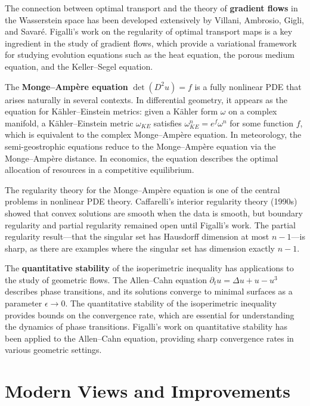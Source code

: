 The connection between optimal transport and the theory of \textbf{gradient flows} in the Wasserstein space has been developed extensively by Villani, Ambrosio, Gigli, and Savar\'e. Figalli's work on the regularity of optimal transport maps is a key ingredient in the study of gradient flows, which provide a variational framework for studying evolution equations such as the heat equation, the porous medium equation, and the Keller--Segel equation.

The \textbf{Monge--Amp\`ere equation} $\det(D^2 u) = f$ is a fully nonlinear PDE that arises naturally in several contexts. In differential geometry, it appears as the equation for K\"ahler--Einstein metrics: given a K\"ahler form $\omega$ on a complex manifold, a K\"ahler--Einstein metric $\omega_{KE}$ satisfies $\omega_{KE}^n = e^f \omega^n$ for some function $f$, which is equivalent to the complex Monge--Amp\`ere equation. In meteorology, the semi-geostrophic equations reduce to the Monge--Amp\`ere equation via the Monge--Amp\`ere distance. In economics, the equation describes the optimal allocation of resources in a competitive equilibrium.

The regularity theory for the Monge--Amp\`ere equation is one of the central problems in nonlinear PDE theory. Caffarelli's interior regularity theory (1990s) showed that convex solutions are smooth when the data is smooth, but boundary regularity and partial regularity remained open until Figalli's work. The partial regularity result---that the singular set has Hausdorff dimension at most $n-1$---is sharp, as there are examples where the singular set has dimension exactly $n-1$.

The \textbf{quantitative stability} of the isoperimetric inequality has applications to the study of geometric flows. The Allen--Cahn equation $\partial_t u = \Delta u + u - u^3$ describes phase transitions, and its solutions converge to minimal surfaces as a parameter $\epsilon \to 0$. The quantitative stability of the isoperimetric inequality provides bounds on the convergence rate, which are essential for understanding the dynamics of phase transitions. Figalli's work on quantitative stability has been applied to the Allen--Cahn equation, providing sharp convergence rates in various geometric settings.

\section{Modern Views and Improvements}

